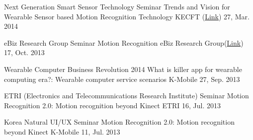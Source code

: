 


\begin{cventries}

  \cventry
    {Next Generation Smart Sensor Technology Seminar} %
    {Trends and Vision for Wearable Sensor based Motion Recognition Technology} %
    {KECFT (\href{http://nvyt.kecft.or.kr/bbs/bbsView.php?id=146&code=bbs_schedule&bbs_id=2}{Link})} %
    {27, Mar. 2014} %
    {}

  \cventry
    {eBiz Research Group Seminar} %
    {Motion Recognition} %
    {eBiz Research Group(\href{http://www.dure.net/SIG.html}{Link})} %
    {17, Oct. 2013} %
    {}

  \cventry
    {Wearable Computer Business Revolution 2014} %
    {What is killer app for wearable computing era?: Wearable computer service scenarios} %
    {K-Mobile} %
    {27, Sep. 2013} %
    {}

  \cventry
    {ETRI (Electronics and Telecommunications Research Institute) Seminar} %
    {Motion Recognition 2.0: Motion recognition beyond Kinect} %
    {ETRI} %
    {16, Jul. 2013} %
    {}

  \cventry
    {Korea Natural UI/UX Seminar} %
    {Motion Recognition 2.0: Motion recognition beyond Kinect} %
    {K-Mobile} %
    {11, Jul. 2013} %
    {}


\end{cventries}
